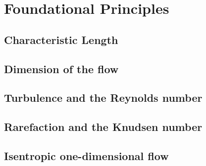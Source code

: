 \section{Foundational Principles}

\subsection{Characteristic Length}  


\subsection{Dimension of the flow}


\subsection{Turbulence and the Reynolds number}


\subsection{Rarefaction and the Knudsen number}


\subsection{Isentropic one-dimensional flow}



